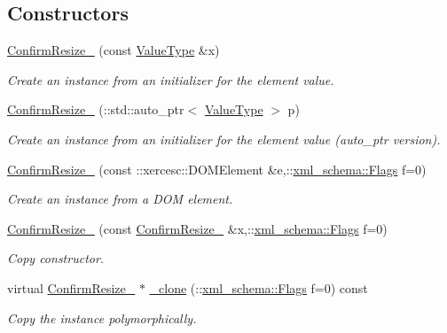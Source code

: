 \subsection*{Constructors}
\begin{DoxyCompactItemize}
\item 
\hyperlink{classopenstack_1_1xml_1_1ConfirmResize___ad2ac1b22bb29e96ff3f35e1cffc3e6df}{ConfirmResize\_\-} (const \hyperlink{classopenstack_1_1xml_1_1ConfirmResize}{ValueType} \&x)
\begin{DoxyCompactList}\small\item\em Create an instance from an initializer for the element value. \item\end{DoxyCompactList}\item 
\hyperlink{classopenstack_1_1xml_1_1ConfirmResize___a147d2b7487e95d99f5e3fdf6d2ad9a7a}{ConfirmResize\_\-} (::std::auto\_\-ptr$<$ \hyperlink{classopenstack_1_1xml_1_1ConfirmResize}{ValueType} $>$ p)
\begin{DoxyCompactList}\small\item\em Create an instance from an initializer for the element value (auto\_\-ptr version). \item\end{DoxyCompactList}\item 
\hyperlink{classopenstack_1_1xml_1_1ConfirmResize___a80f6174a9ec82a52fe6c08a634482c09}{ConfirmResize\_\-} (const ::xercesc::DOMElement \&e,::\hyperlink{namespacexml__schema_affb4c227cbd9aa7453dd1dc5a1401943}{xml\_\-schema::Flags} f=0)
\begin{DoxyCompactList}\small\item\em Create an instance from a DOM element. \item\end{DoxyCompactList}\item 
\hyperlink{classopenstack_1_1xml_1_1ConfirmResize___acc6f59319d46cc14230bfb9ba19bb1d3}{ConfirmResize\_\-} (const \hyperlink{classopenstack_1_1xml_1_1ConfirmResize__}{ConfirmResize\_\-} \&x,::\hyperlink{namespacexml__schema_affb4c227cbd9aa7453dd1dc5a1401943}{xml\_\-schema::Flags} f=0)
\begin{DoxyCompactList}\small\item\em Copy constructor. \item\end{DoxyCompactList}\item 
virtual \hyperlink{classopenstack_1_1xml_1_1ConfirmResize__}{ConfirmResize\_\-} $\ast$ \hyperlink{classopenstack_1_1xml_1_1ConfirmResize___a4f0d3a1a6adead18dbdabaf35d5847ae}{\_\-clone} (::\hyperlink{namespacexml__schema_affb4c227cbd9aa7453dd1dc5a1401943}{xml\_\-schema::Flags} f=0) const 
\begin{DoxyCompactList}\small\item\em Copy the instance polymorphically. \item\end{DoxyCompactList}\end{DoxyCompactItemize}
